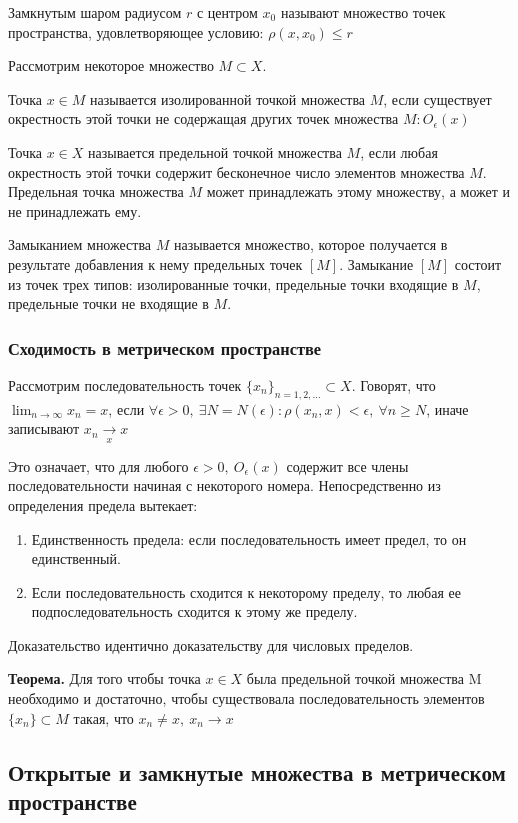 \documentclass[14pt]{extarticle}
\theoremstyle{definition}
\theoremstyle{remark}
\newcommand{\be}{\begin{enumerate}}
\newcommand{\ee}{\end{enumerate}}
\renewcommand{\[}{\begin{dmath*}[compact]}
\renewcommand{\]}{\end{dmath*}}
\newcommand{\sep}{ , \ \allowbreak }
\newcommand{\tth}[1][]{\textbf{Теорема#1.}}
\begin{document}
Замкнутым шаром радиусом $r$ с центром $x_0$ называют множество точек
пространства, удовлетворяющее условию: $\rho(x, x_0) \leq r$

Рассмотрим некоторое множество $M \subset X$.

Точка $x \in M$ называется изолированной точкой множества $M$, если существует
окрестность этой точки не содержащая других точек множества $M: O_\epsilon(x)$

Точка $x \in X$ называется предельной точкой множества $M$, если любая
окрестность этой точки содержит бесконечное число элементов множества $M$.
Предельная точка множества $M$ может принадлежать этому множеству, а может
и не принадлежать ему.

Замыканием множества $M$ называется множество, которое получается в результате
добавления к нему предельных точек $[M]$.
Замыкание $[M]$ состоит из точек трех типов: изолированные точки, предельные
точки входящие в $M$, предельные точки не входящие в $M$.

\subsubsection{Сходимость в метрическом пространстве}

Рассмотрим последовательность точек $\{x_n\}_{n=1,2,\dots}\subset X$.
Говорят, что $\lim_{n \to \infty} x_n = x$, если
$\forall \epsilon > 0 \sep \exists N = N(\epsilon): \rho(x_n, x)<\epsilon \sep
\forall n \geq N$, иначе записывают $x_n\xrightarrow[x]{}x$

Это означает, что для любого $\epsilon > 0 \sep O_\epsilon(x)$ содержит все
члены последовательности начиная с некоторого номера. Непосредственно из
определения предела вытекает:

\be
  \item Единственность предела: если последовательность имеет предел,
  то он единственный.

  \item Если последовательность сходится к некоторому пределу,
  то любая ее подпоследовательность сходится к этому же пределу.
\ee

Доказательство идентично доказательству для числовых пределов.

\tth[] Для того чтобы точка $x \in X$ была предельной точкой множества M
необходимо и достаточно, чтобы существовала последовательность элементов
$\{x_n\}\subset M$ такая, что $x_n\neq x \sep x_n\to x$

\subsection{Открытые и замкнутые множества в метрическом пространстве}
\end{document}
